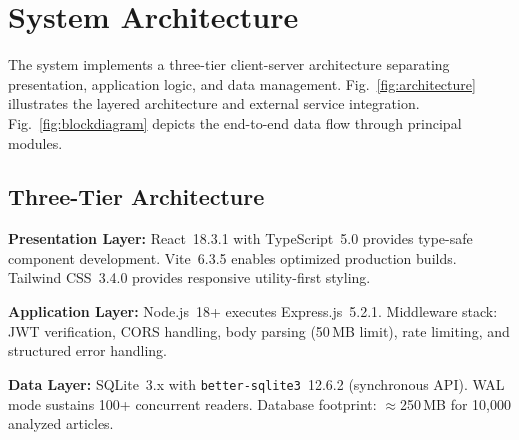 \documentclass[conference]{IEEEtran}
\begin{document}
\section{System Architecture}

The system implements a three-tier client-server architecture separating presentation, application logic, and data management. Fig.~\ref{fig:architecture} illustrates the layered architecture and external service integration. Fig.~\ref{fig:blockdiagram} depicts the end-to-end data flow through principal modules.

\subsection{Three-Tier Architecture}

\textbf{Presentation Layer:} React~18.3.1 with TypeScript~5.0 provides type-safe component development. Vite~6.3.5 enables optimized production builds. Tailwind CSS~3.4.0 provides responsive utility-first styling.

\textbf{Application Layer:} Node.js~18+ executes Express.js~5.2.1. Middleware stack: JWT verification, CORS handling, body parsing (50\,MB limit), rate limiting, and structured error handling.

\textbf{Data Layer:} SQLite~3.x with \texttt{better-sqlite3}~12.6.2 (synchronous API). WAL mode sustains 100+ concurrent readers. Database footprint: $\approx$250\,MB for 10{,}000 analyzed articles.
\end{document}
